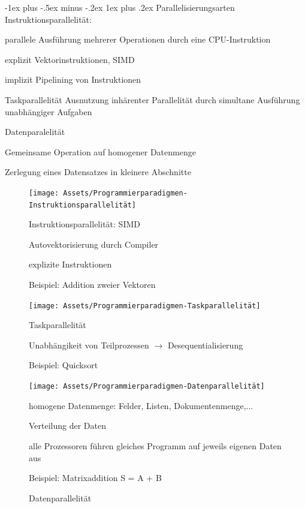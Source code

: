\documentclass[10pt]{article}
\makeatletter
\renewcommand{\subsubsection}{\@startsection{subsubsection}{3}{0mm}%
                                {-1ex plus -.5ex minus -.2ex}%
                                {1ex plus .2ex}%
                                {\normalfont\small\bfseries}}
\makeatother
\begin{document}
\subsubsection{Parallelisierungsarten}
Instruktionsparallelität:	
\begin{description*}
  \item[parallele Ausführung] mehrerer Operationen durch eine CPU-Instruktion
  \item[explizit] Vektorinstruktionen, SIMD
  \item[implizit] Pipelining von Instruktionen
  \item[Taskparallelität] Ausnutzung inhärenter Parallelität durch simultane Ausführung unabhängiger Aufgaben
  \item[Datenparalelität] \hfill
  \begin{itemize*}
    \item Gemeinsame Operation auf homogener Datenmenge
    \item Zerlegung eines Datensatzes in kleinere Abschnitte
  \end{itemize*}
\end{description*}

\begin{figure}[!tbp]
  \centering
  \begin{minipage}[b]{0.45\textwidth}
    \texttt{[image: Assets/Programmierparadigmen-Instruktionsparallelität]}
    \caption{Instruktionsparallelität: SIMD}
    \begin{itemize*}
      \item Autovektorisierung durch Compiler
      \item explizite Instruktionen
      \item Beispiel: Addition zweier Vektoren
    \end{itemize*}
  \end{minipage}
  \hfill
  \begin{minipage}[b]{0.45\textwidth}
    \texttt{[image: Assets/Programmierparadigmen-Taskparallelität]}
    \caption{Taskparallelität}
    \begin{itemize*}
      \item Unabhängikeit von Teilprozessen $\rightarrow$ Desequentialisierung
      \item Beispiel: Quicksort
    \end{itemize*}
  \end{minipage}
  \vfill
  \begin{minipage}[b]{0.45\textwidth}
    \texttt{[image: Assets/Programmierparadigmen-Datenparallelität]}
    \caption{Datenparallelität}
    \begin{itemize*}
      \item homogene Datenmenge: Felder, Listen, Dokumentenmenge,...
      \item Verteilung der Daten
      \item alle Prozessoren führen gleiches Programm auf jeweils eigenen Daten aus
      \item Beispiel: Matrixaddition S = A + B
    \end{itemize*}
  \end{minipage}
\end{figure}
\end{document}
